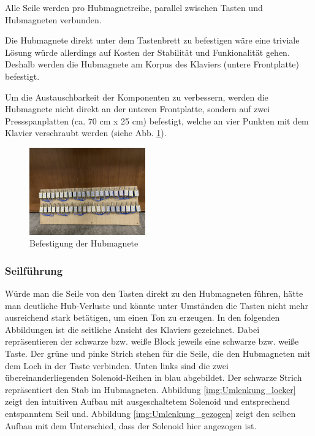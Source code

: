 Alle Seile werden pro Hubmagnetreihe, parallel zwischen Tasten und Hubmagneten verbunden.

Die Hubmagnete direkt unter dem Tastenbrett zu befestigen wäre eine triviale Lösung würde allerdings auf Kosten der Stabilität und Funkionalität gehen. %
Deshalb werden die Hubmagnete am Korpus des Klaviers (untere Frontplatte) befestigt.

Um die Austauschbarkeit der Komponenten zu verbessern, werden die Hubmagnete nicht direkt an der unteren Frontplatte,
sondern auf zwei Pressspanplatten (ca. 70 cm x 25 cm) befestigt, welche an vier Punkten mit dem Klavier verschraubt werden (siehe Abb. \ref{fig:BefestigungHubmagnete}). %

\begin{figure}[htbp]
    \centering
    \includegraphics[width=5cm]{img/Magnetbrett.jpg}
    \caption{Befestigung der Hubmagnete}
    \label{fig:BefestigungHubmagnete}
\end{figure}

\subsubsection{Seilführung}

Würde man die Seile von den Tasten direkt zu den Hubmagneten führen,
hätte man deutliche Hub-Verluste und könnte unter Umständen die Tasten nicht mehr ausreichend stark betätigen, um einen Ton zu erzeugen.
\newline
In den folgenden Abbildungen ist die seitliche Ansicht des Klaviers gezeichnet.
Dabei repräsentieren der schwarze bzw. weiße Block jeweils eine schwarze bzw. weiße Taste.
Der grüne und pinke Strich stehen für die Seile, die den Hubmagneten mit dem Loch in der Taste verbinden.
Unten links sind die zwei übereinanderliegenden Solenoid-Reihen in blau abgebildet.
Der schwarze Strich repräsentiert den Stab im Hubmagneten. %
\newline
Abbildung \ref{img:Umlenkung_locker} zeigt den intuitiven Aufbau mit ausgeschaltetem Solenoid und entsprechend entspanntem Seil und.
Abbildung \ref{img:Umlenkung_gezogen} zeigt den selben Aufbau mit dem Unterschied, dass der Solenoid hier angezogen ist.


